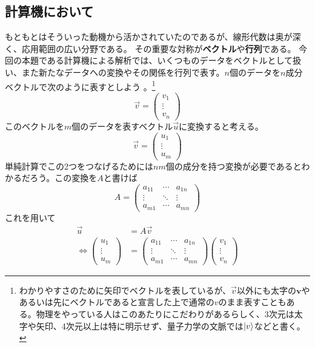 \documentclass[10pt]{jsarticle}
\theoremstyle{definition}%
\newcommand{\vc}[1]{\overrightarrow{#1}}%
\newcommand{\vct}[1]{\bm{#1}}%
\numberwithin{equation}{section}%
\begin{document}
\subsection{計算機において}
もともとはそういった動機から活かされていたのであるが、線形代数は奥が深く、応用範囲の広い分野である。
その重要な対称が{\bf ベクトル}や{\bf 行列}である。
今回の本題である計算機による解析では、いくつものデータをベクトルとして扱い、また新たなデータへの変換やその関係を行列で表す。$n$個のデータを$n$成分ベクトルで次のように表すとしよう
。\footnote{わかりやすさのために矢印でベクトルを表しているが、$\vc{v}$以外にも太字の$\vct{v}$やあるいは先にベクトルであると宣言した上で通常の$v$のまま表すこともある。物理をやっている人はこのあたりにこだわりがあるらしく、3次元は太字や矢印、4次元以上は特に明示せず、量子力学の文脈では$\ket{v}$などと書く。}
\begin{equation}
  \vc{v}=\left( \begin{matrix}
    v_{1}\\
    \vdots \\
    v_{n}
  \end{matrix} \right)
\end{equation}
このベクトルを$m$個のデータを表すベクトル$\vc{u}$に変換すると考える。
\begin{equation}
  \vc{v}=\left( \begin{matrix}
    u_{1}\\
    \vdots \\
    u_{m}
  \end{matrix} \right)
\end{equation}
単純計算でこの2つをつなげるためには$nm$個の成分を持つ変換が必要であるとわかるだろう。この変換を$A$と書けば
\begin{equation}
  A=\left( \begin{matrix}
    a_{11} & \cdots & a_{1n} \\
    \vdots & \ddots & \vdots \\
    a_{m1} & \cdots & a_{mn}
  \end{matrix} \right)
\end{equation}
これを用いて
\begin{align}
  \vc{u} &= A \vc{v}\\
 \Leftrightarrow  \left( \begin{matrix}
    u_{1}\\
    \vdots \\
    u_{m}
  \end{matrix} \right)&=\left( \begin{matrix}
    a_{11} & \cdots & a_{1n} \\
    \vdots & \ddots & \vdots \\
    a_{m1} & \cdots & a_{mn}
  \end{matrix} \right)\left( \begin{matrix}
    v_{1}\\
    \vdots \\
    v_{n}
  \end{matrix} \right)
\end{align}
\end{document}
